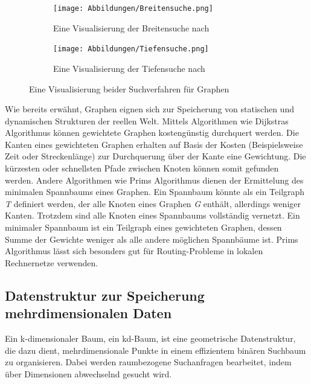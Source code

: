 \begin{figure}[t]
	\centering
	\begin{subfigure}[h]{0.49\textwidth}
		\texttt{[image: Abbildungen/Breitensuche.png]}
		\centering
		\caption[Breitensuche in Graphen]{Eine Visualisierung der Breitensuche nach \textcite[228]{knebl_algorithmen_2021}}
		\label{fig: breitensuche}
	\end{subfigure}
	\hfill
	\begin{subfigure}[h]{0.49\textwidth}
		\texttt{[image: Abbildungen/Tiefensuche.png]}
		\centering
		\caption[Tiefensuche in Graphen]{Eine Visualisierung der Tiefensuche nach \textcite[232]{knebl_algorithmen_2021}}
		\label{fig: tiefensuche}
	\end{subfigure}
	\caption[Suchverfahren von Graphen]{Eine Visualisierung beider Suchverfahren für Graphen}
	\label{fig: graph_search_functions}
\end{figure}

Wie bereits erwähnt, Graphen eignen sich zur Speicherung von statischen und dynamischen Strukturen der reellen Welt. Mittels Algorithmen wie Dijkstras Algorithmus können gewichtete Graphen kostengünstig durchquert werden. Die Kanten eines gewichteten Graphen erhalten auf Basis der Kosten (Beispielsweise Zeit oder Streckenlänge) zur Durchquerung über der Kante eine Gewichtung. Die kürzesten oder schnellsten Pfade zwischen Knoten können somit gefunden werden. Andere Algorithmen wie Prims Algorithmus dienen der Ermittelung des minimalen Spannbaums eines Graphen. Ein Spannbaum könnte als ein Teilgraph \textit{T} definiert werden, der alle Knoten eines Graphen \textit{G} enthält, allerdings weniger Kanten. Trotzdem sind alle Knoten eines Spannbaums vollständig vernetzt. Ein minimaler Spannbaum ist ein Teilgraph eines gewichteten Graphen, dessen Summe der Gewichte weniger als alle andere möglichen Spannbäume ist. Prims Algorithmus lässt sich besonders gut für Routing-Probleme in lokalen Rechnernetze verwenden. \autocite[277-282]{hubwieser_fundamente_2015}

\subsection{Datenstruktur zur Speicherung mehrdimensionalen Daten}

Ein k-dimensionaler Baum, ein kd-Baum, ist eine geometrische Datenstruktur, die dazu dient, mehrdimensionale Punkte in einem effizientem binären Suchbaum zu organisieren. Dabei werden raumbezogene Suchanfragen bearbeitet, indem über Dimensionen abwechselnd gesucht wird. \autocite[92]{saha_advanced_2019} \autocite{bentley_fast_1978}

